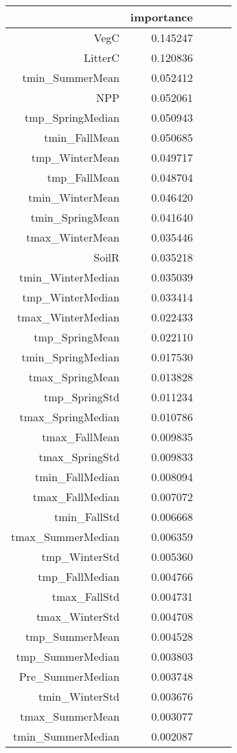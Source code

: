 \begin{tabular}{rrrrr}
\toprule
 & importance \\
\midrule
VegC & 0.145247 \\
LitterC & 0.120836 \\
tmin_SummerMean & 0.052412 \\
NPP & 0.052061 \\
tmp_SpringMedian & 0.050943 \\
tmin_FallMean & 0.050685 \\
tmp_WinterMean & 0.049717 \\
tmp_FallMean & 0.048704 \\
tmin_WinterMean & 0.046420 \\
tmin_SpringMean & 0.041640 \\
tmax_WinterMean & 0.035446 \\
SoilR & 0.035218 \\
tmin_WinterMedian & 0.035039 \\
tmp_WinterMedian & 0.033414 \\
tmax_WinterMedian & 0.022433 \\
tmp_SpringMean & 0.022110 \\
tmin_SpringMedian & 0.017530 \\
tmax_SpringMean & 0.013828 \\
tmp_SpringStd & 0.011234 \\
tmax_SpringMedian & 0.010786 \\
tmax_FallMean & 0.009835 \\
tmax_SpringStd & 0.009833 \\
tmin_FallMedian & 0.008094 \\
tmax_FallMedian & 0.007072 \\
tmin_FallStd & 0.006668 \\
tmax_SummerMedian & 0.006359 \\
tmp_WinterStd & 0.005360 \\
tmp_FallMedian & 0.004766 \\
tmax_FallStd & 0.004731 \\
tmax_WinterStd & 0.004708 \\
tmp_SummerMean & 0.004528 \\
tmp_SummerMedian & 0.003803 \\
Pre_SummerMedian & 0.003748 \\
tmin_WinterStd & 0.003676 \\
tmax_SummerMean & 0.003077 \\
tmin_SummerMedian & 0.002087 \\

\end{tabular}

